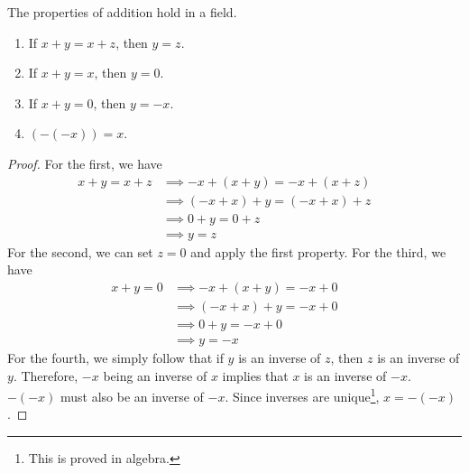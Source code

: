   \begin{lemma}
    \label{thm:properties-of-addition}
    The properties of addition hold in a field. 
    \begin{enumerate}
      \item If $x + y = x + z$, then $y = z$. 
      \item If $x + y = x$, then $y = 0$. 
      \item If $x + y = 0$, then $y = -x$. 
      \item $(-(-x)) = x$. 
    \end{enumerate}
  \end{lemma}
  \begin{proof}
    For the first, we have 
    \begin{align}
      x + y = x + z & \implies -x + (x + y) = -x + (x + z) && \tag{addition is a function} \\
                    & \implies (-x + x) + y = (-x + x) + z && \tag{$+$ is associative} \\
                    & \implies 0 + y = 0 + z && \tag{definition of additive inverse} \\
                    & \implies y = z && \tag{definition of identity}
    \end{align} 
    For the second, we can set $z = 0$ and apply the first property. For the third, we have 
    \begin{align}
      x + y = 0 & \implies -x + (x + y) = -x + 0 && \tag{addition is a function} \\
                & \implies (-x + x) + y = -x + 0 && \tag{$+$ is associative} \\
                & \implies 0 + y = -x + 0 && \tag{definition of additive inverse} \\
                & \implies y = -x && \tag{definition of identity}
    \end{align}
    For the fourth, we simply follow that if $y$ is an inverse of $z$, then $z$ is an inverse of $y$. Therefore, $-x$ being an inverse of $x$ implies that $x$ is an inverse of $-x$. $-(-x)$ must also be an inverse of $-x$. Since inverses are unique\footnote{This is proved in algebra.}, $x = -(-x)$. 
  \end{proof}

